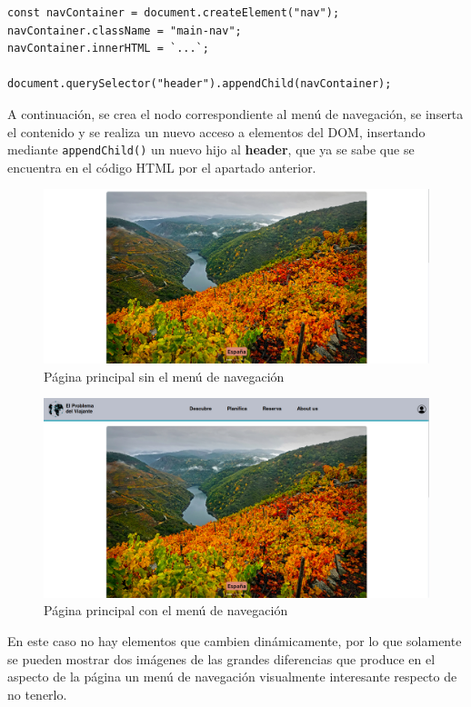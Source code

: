 \documentclass[11pt, a4paper]{book}
\begin{document}
	\begin{lstlisting}
const navContainer = document.createElement("nav");
navContainer.className = "main-nav";
navContainer.innerHTML = `...`;

document.querySelector("header").appendChild(navContainer);
	\end{lstlisting}
	
	A continuación, se crea el nodo correspondiente al menú de navegación, se inserta el contenido y se realiza un nuevo acceso a elementos del DOM, insertando mediante \texttt{appendChild()} un nuevo hijo al \textbf{header}, que ya se sabe que se encuentra en el código HTML por el apartado anterior.
	
	\begin{figure} [H]
		\centering
		\includegraphics[width=\textwidth]{CSS/1-1 1920cut.png}
		\caption{Página principal sin el menú de navegación}
	\end{figure}
	\begin{figure} [H]
		\centering
		\includegraphics[width=\textwidth]{CSS/1-1 1920.png}
		\caption{Página principal con el menú de navegación}
	\end{figure}

	En este caso no hay elementos que cambien dinámicamente, por lo que solamente se pueden mostrar dos imágenes de las grandes diferencias que produce en el aspecto de la página un menú de navegación visualmente interesante respecto de no tenerlo.
	
\end{document}
